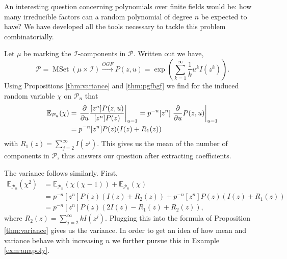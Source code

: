 \begin{exm}
\label{ex:polyprob}
An interesting question concerning polynomials over finite fields would be: how many irreducible factors can a random polynomial of degree $n$ be expected to have?
We have developed all the tools necessary to tackle this problem combinatorially.

Let $\mu$ be marking the $\mathcal{I}$-components in $\mathcal{P}$. 
Written out we have, 
\begin{equation*}
    \mathcal{P} = \operatorname{MSet}(\mu \times \mathcal{I}) \xrightarrow{OGF} P(z,u) = \exp\left( \sum_{k=1}^\infty \frac{1}{k} u^k I(z^k) \right).
\end{equation*}
Using Propositions \ref{thm:variance} and \ref{thm:pgfbgf} we find for the induced random variable $\chi$ on $\mathcal{P}_n$ that
\begin{align*}
    \mathbb{E}_{\mathcal{P}_n}(\chi) &= \eval{\frac{\partial}{\partial u} \frac{[z^n] P(z,u)}{[z^n] P(z)}}_{u = 1} 
    = p^{-n} [z^n] \eval{\frac{\partial}{\partial u}P(z,u)}_{u = 1} \\
    &= p^{-n} [z^n] P(z) ( I(z) + R_1(z))
\end{align*}
with $R_1(z) = \sum_{j=2}^\infty I(z^j)$. 
This gives us the mean of the number of components in $\mathcal{P}$, thus answers our question after extracting coefficients.

The variance follows similarly. First, 
\begin{align*}
    \mathbb{E}_{\mathcal{P}_n}(\chi^2) &= \mathbb{E}_{\mathcal{P}_n}(\chi (\chi - 1)) + \mathbb{E}_{\mathcal{P}_n}(\chi)\\
    &= p^{-n} [z^n] P(z) \left( I(z) + R_2(z) \right) + p^{-n} [z^n] P(z) ( I(z) + R_1(z)) \\
    &= p^{-n} [z^n] P(z) (2 I(z) - R_1(z) + R_2(z)), 
\end{align*}
where $R_2(z) = \sum_{j=2}^\infty k I(z^j)$.
Plugging this into the formula of Proposition \ref{thm:variance} gives us the variance.
In order to get an idea of how mean and variance behave with increasing $n$ we further pursue this in Example \ref{exm:anapoly}.
\end{exm}